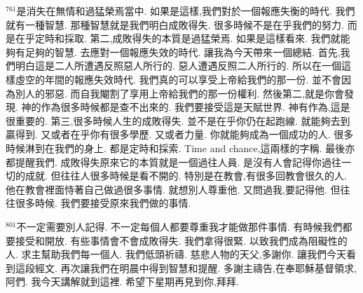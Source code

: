 \documentclass{book}
\begin{document}
$^{761}$是消失在無情和過猛榮焉當中.
如果是這樣,我們對於一個報應失衡的時代.
我們就有一種智慧.
那種智慧就是我們明白成敗得失.
很多時候不是在乎我們的努力.
而是在乎定時和採取.
第二,成敗得失的本質是過猛榮焉.
如果是這樣看來.
我們就能夠有足夠的智慧.
去應對一個報應失效的時代.
讓我為今天帶來一個總結.
首先,我們明白這是二人所遭遇反照惡人所行的.
惡人遭遇反照二人所行的.
所以在一個這樣虛空的年間的報應失效時代.
我們真的可以享受上帝給我們的那一份.
並不會因為別人的邪惡.
而自我閹割了享用上帝給我們的那一份權利.
然後第二,就是你會發現.
神的作為很多時候都是查不出來的.
我們要接受這是天賦世界.
神有作為,這是很重要的.
第三,很多時候人生的成敗得失.
並不是在乎你仍在起跑線.
就能夠去到贏得到.
又或者在乎你有很多學歷.
又或者力量.
你就能夠成為一個成功的人.
很多時候淋到在我們的身上.
都是定時和採索.
Time and chance,這兩樣的字稱.
最後亦都提醒我們.
成敗得失原來它的本質就是一個過往人員.
是沒有人會記得你過往一切的成就.
但往往人很多時候是看不開的.
特別是在教會,有很多回教會很久的人.
他在教會裡面恃著自己做過很多事情.
就想別人尊重他.
又問過我,要記得他.
但往往很多時候.
我們要接受原來我們做的事情.

$^{801}$不一定需要別人記得.
不一定每個人都要尊重我才能做那件事情.
有時候我們都要接受和開放.
有些事情會不會成敗得失.
我們拿得很緊.
以致我們成為阻礙性的人.
求主幫助我們每一個人.
我們低頭祈禱.
慈悲人物的天父,多謝你.
讓我們今天看到這段經文.
再次讓我們在明晨中得到智慧和提醒.
多謝主禱告,在奉耶穌基督領求,阿們.
我今天講解就到這裡.
希望下星期再見到你,拜拜.
\newpage
\end{document}
